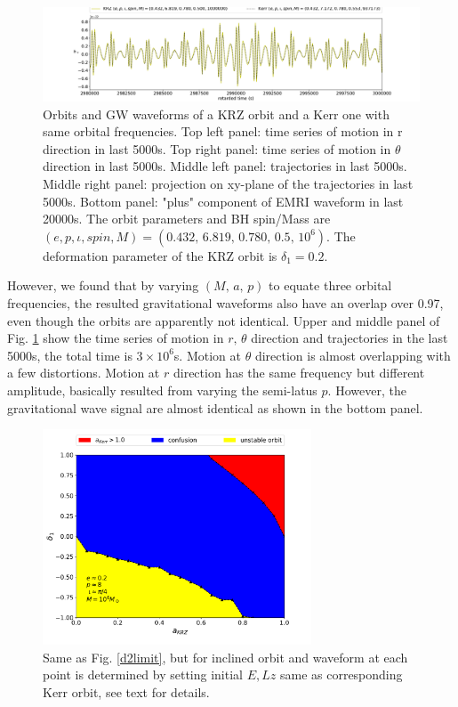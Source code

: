 \documentclass{article}
\begin{document}
\begin{figure}[!ht]
	\includegraphics[width=14cm]{wave_d102.pdf}
	
	\caption{Orbits and GW waveforms of a KRZ orbit and a Kerr one with same orbital frequencies. Top left panel: time series of motion in r direction in last 5000s. Top right panel: time series of motion in $\theta$ direction in last 5000s. Middle left panel: trajectories in last 5000s. Middle right panel: projection on xy-plane of the trajectories in last 5000s. Bottom panel: "plus" component of EMRI waveform in last 20000s. The orbit parameters and BH spin/Mass are $(e,p,\iota,spin,M)=(0.432,\, 6.819,\, 0.780,\, 0.5,\, 10^6)$. The deformation parameter of the KRZ orbit is $\delta_1=0.2$.}
	\label{3dtraj}
\end{figure}

However, we found that by varying $(M,\, a,\, p)$ to equate three orbital frequencies, the resulted gravitational waveforms also have an overlap over 0.97, even though the orbits are apparently not identical. Upper and middle panel of Fig. \ref{3dtraj} show the time series of motion in $r,\, \theta $ direction and trajectories in the last 5000s, the total time is $3\times 10^6$s. Motion at $\theta$ direction is almost overlapping with a few distortions. Motion at $r$ direction has the same frequency but different amplitude, basically resulted from varying the semi-latus $p$. However, the gravitational wave signal are almost identical as shown in the bottom panel. 

\begin{figure}[!ht]
	\centering
	\includegraphics[width=8cm]{3D_bound.pdf}
	
	\caption{Same as Fig. \ref{d2limit}, but for inclined orbit and waveform at each point is determined by setting initial $E,Lz$ same as corresponding Kerr orbit, see text for details.}
	\label{3dlimit}
\end{figure}
\end{document}
